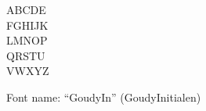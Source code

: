 \documentclass[a4paper]{article}
\begin{document}
\begin{center}
\fontsize{60pt}{72pt}
  ABCDE \\
  FGHIJK \\
  LMNOP \\
  QRSTU \\
  VWXYZ \\
\end{center}
\vfill
\begin{center}
Font name: ``GoudyIn'' (GoudyInitialen)
\end{center}
\end{document}
